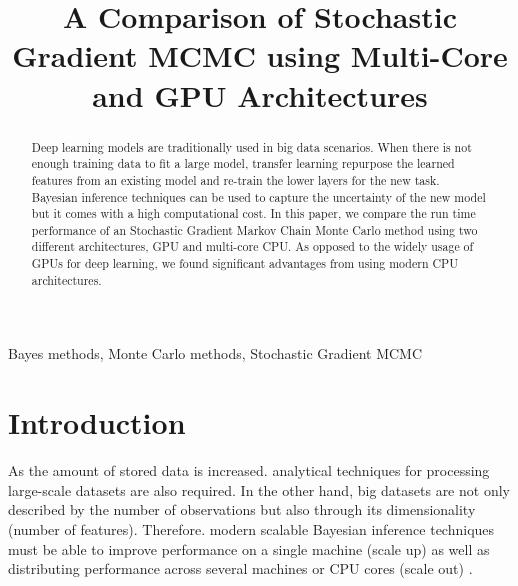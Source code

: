 \documentclass[conference]{IEEEtran}
\begin{document}
	
	\title{A Comparison of Stochastic Gradient MCMC using Multi-Core and GPU Architectures}
	
	\author{
		\and
		\and
	}
	
	\maketitle
	
	\begin{abstract}
		Deep learning models are traditionally used in big data scenarios. When there is not enough training data to fit a large model, transfer learning repurpose the learned features from an existing model and re-train the lower layers for the new task. Bayesian inference techniques can be used to capture the uncertainty of the new model but it comes with a high computational cost. In this paper, we compare the run time performance of an Stochastic Gradient Markov Chain Monte Carlo method using two different architectures, GPU and multi-core CPU. As opposed to the widely usage of GPUs for deep learning, we found significant advantages from using modern CPU architectures.
	\end{abstract}
	
	\begin{IEEEkeywords}
		Bayes methods, Monte Carlo methods, Stochastic Gradient MCMC
	\end{IEEEkeywords}

\section{Introduction}
As the amount of stored data is increased. analytical techniques for processing large-scale datasets are also required. In the other hand, big datasets are not only described by the number of observations but also through its dimensionality (number of features). Therefore. modern scalable Bayesian inference techniques must be able to improve performance on a single machine (scale up) as well as distributing performance across several machines or CPU cores (scale out) \cite{angelino2016patterns}.
\end{document}
